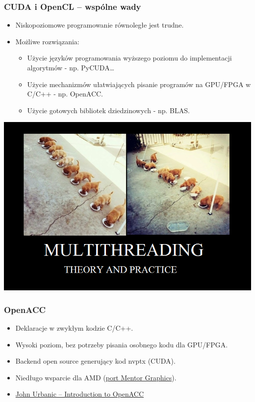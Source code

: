 \documentclass[dvipsnames,table]{beamer}
\begin{document}
\begin{frame}
	\frametitle{CUDA i OpenCL -- wspólne wady}
\begin{itemize}

	\item Niskopoziomowe programowanie równoległe jest trudne.
	\item Możliwe rozwiązania: 
	\begin{itemize}
	\item Użycie języków programowania wyższego poziomu do implementacji algorytmów - np. PyCUDA\ldots
	\item Użycie mechanizmów ułatwiających pisanie programów na GPU/FPGA w C/C++ - np. OpenACC.
	\item Użycie gotowych bibliotek dziedzinowych - np. BLAS.
	\end{itemize}
\end{itemize}
\begin{center}
\includegraphics[scale=0.25]{img-threadpuppies.png}
\end{center}
\end{frame}

\begin{frame}
	\frametitle{OpenACC}
\begin{itemize}
	\item Deklaracje w zwykłym kodzie C/C++.
	\item Wysoki poziom, bez potrzeby pisania osobnego kodu dla GPU/FPGA.
	\item Backend open source generujący kod nvptx (CUDA).
	\item Niedługo wsparcie dla AMD (\href{https://gcc.gnu.org/ml/gcc/2018-05/msg00071.html}{port Mentor Graphics}).
	\item \href{https://www.psc.edu/images/xsedetraining/OpenACC_Mar2016/OpenACC_Introduction_To_OpenACC.PDF}{John Urbanic -- Introduction to OpenACC}
\end{itemize}
\end{frame}
\end{document}
